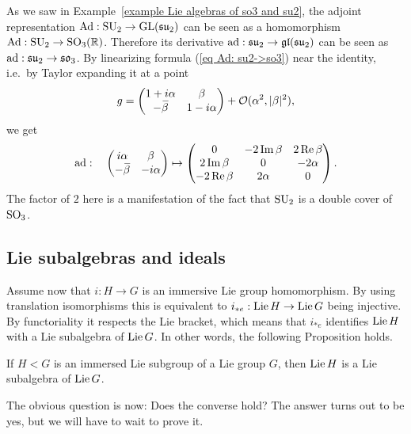 \begin{example}
    As we saw in Example~\ref{example Lie algebras of so3 and su2}, the adjoint representation $\mathrm{Ad}:\operatorname{SU}_2\to \operatorname{GL}(\mathfrak{su}_2)$ can be seen as a homomorphism $\mathrm{Ad}:\operatorname{SU}_2\to \operatorname{SO}_3(\mathbb{R})$. Therefore its derivative $\mathrm{ad}:\mathfrak{su}_2\to \mathfrak{gl}(\mathfrak{su}_2)$ can be seen as $\mathrm{ad}:\mathfrak{su}_2\to \mathfrak{so}_3$. By linearizing formula (\ref{eq Ad: su2->so3}) near the identity, i.e.~by Taylor expanding it at a point
    \[g=
    \begin{pmatrix}
        1+i\alpha &\beta \\
        -\wb{\beta} & 1-i\alpha
    \end{pmatrix}+\calO(\alpha^2,|\beta|^2),
    \]
    we get 
    \[\ad:\quad \begin{pmatrix}
        i\alpha&\beta\\-\wb{\beta}&-i\alpha
    \end{pmatrix}\mapsto 
    \begin{pmatrix}
        0&-2\Im \beta & 2\Re\beta\\
        2\Im \beta & 0 & -2\alpha \\
        -2\Re\beta & 2\alpha & 0
    \end{pmatrix}.\label{eq ad: su2->so3}\]
    The factor of $2$ here is a manifestation of the fact that $\operatorname{SU}_2$ is a double cover of $\operatorname{SO}_3$.
\end{example}





\subsection{Lie subalgebras and ideals}

Assume now that $i:H\to G$ is an immersive Lie group homomorphism. By using translation isomorphisms this is equivalent to $i_{\ast e}:\operatorname{Lie} H\to \operatorname{Lie} G$ being injective. By functoriality it respects the Lie bracket, which means that $i_{\ast e}$ identifies $\operatorname{Lie} H$ with a Lie subalgebra of $\operatorname{Lie} G$. In other words, the following Proposition holds.

\begin{prop}
    If $H<G$ is an immersed Lie subgroup of a Lie group $G$, then $\operatorname{Lie} H$ is a Lie subalgebra of $\operatorname{Lie} G$.
\end{prop}

The obvious question is now: Does the converse hold? The answer turns out to be yes, but we will have to wait to prove it.

